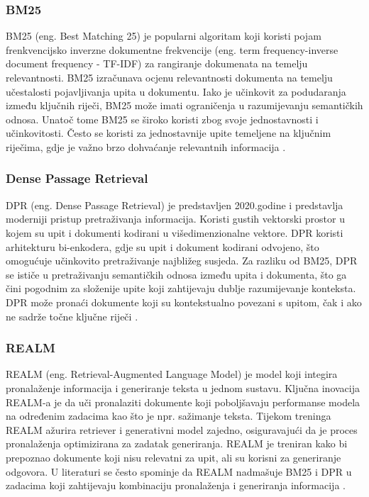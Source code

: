\documentclass[]{foi}
\begin{document}
\subsubsection{BM25}
BM25 (eng. Best Matching 25) je popularni algoritam koji koristi pojam frenkvencijsko inverzne dokumentne frekvencije (eng. term frequency-inverse document frequency - TF-IDF) za rangiranje dokumenata na temelju relevantnosti.
BM25 izračunava ocjenu relevantnosti dokumenta na temelju učestalosti pojavljivanja upita u dokumentu. Iako je učinkovit za podudaranja
između ključnih riječi, BM25 može imati ograničenja u razumijevanju semantičkih odnosa. Unatoč tome BM25 se široko koristi zbog svoje jednostavnosti
i učinkovitosti. Često se koristi za jednostavnije upite temeljene na ključnim riječima, gdje je važno brzo dohvaćanje relevantnih informacija \cite{gupta2024rag}.

\subsubsection{Dense Passage Retrieval}
DPR (eng. Dense Passage Retrieval) je predstavljen 2020.godine i predstavlja moderniji pristup pretraživanja informacija. Koristi gustih
vektorski prostor u kojem su upit i dokumenti kodirani u višedimenzionalne vektore. DPR koristi arhitekturu bi-enkodera, gdje su upit 
i dokument kodirani odvojeno, što omogućuje učinkovito pretraživanje najbližeg susjeda. Za razliku od BM25, DPR se ističe u pretraživanju
semantičkih odnosa između upita i dokumenta, što ga čini pogodnim za složenije upite koji zahtijevaju dublje razumijevanje konteksta. DPR može
pronaći dokumente koji su kontekstualno povezani s upitom, čak i ako ne sadrže točne ključne riječi \cite{gupta2024rag}.

\subsubsection{REALM}
REALM (eng. Retrieval-Augmented Language Model) je model koji integira pronalaženje informacija i generiranje teksta u jednom sustavu.
Ključna inovacija REALM-a je da uči pronalaziti dokumente koji poboljšavaju performanse modela na određenim zadacima kao što je npr.
sažimanje teksta. Tijekom treninga REALM ažurira retriever i generativni model zajedno, osiguravajući da je proces pronalaženja optimizirana
za zadatak generiranja. REALM je treniran kako bi prepoznao dokumente koji nisu relevatni za upit, ali su korisni za generiranje odgovora.
U literaturi se često spominje da REALM nadmašuje BM25 i DPR u zadacima koji zahtijevaju kombinaciju pronalaženja i generiranja informacija \cite{gupta2024rag}.
\end{document}

